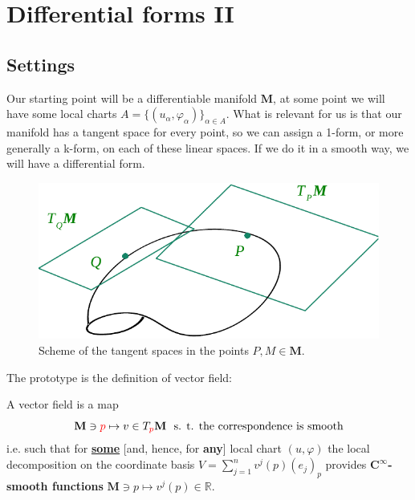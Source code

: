 \documentclass[../main.tex]{subfiles}
\begin{document}
\setchapterpreamble[u]{\margintoc}
\chapter[Differential forms II]{Differential forms II\footnotemark[0]}
\section*{Settings}
Our starting point will be a differentiable manifold $\mathbf{M}$, at some point we will have some local charts $A=\{(u_{\alpha},\varphi_{\alpha})\}_{\alpha\in A}$. What is relevant for us is that our manifold has a tangent space for every point, so we can assign a 1-form, or more generally a k-form, on each of these linear spaces. If we do it in a smooth way, we will have a differential form. 
\begin{figure}[H]
	\includegraphics{images/differential_forms_scheme_II.pdf}
	\caption{Scheme of the tangent spaces in the points $P,M\in\mathbf{M}$.}
\end{figure}
The prototype is the definition of vector field:
\begin{definition}
A vector field is a map
\[\mathbf{M}\ni {\color{red}p}\mapsto v\in T_{\color{red}p} \mathbf{M} \ \textrm{ s. t. the correspondence is smooth}\]
i.e. such that for \textbf{\underline{some}} [and, hence, for \textbf{any}] local chart $(u,\varphi)$ the local decomposition on the coordinate basis $V=\sum_{j=1}^n v^j(p)(e_j)_p$ provides $\mathbf{C^{\infty}}$\textbf{-smooth functions} $\mathbf{M}\ni p\mapsto v^j(p)\in\mathbb{R}$.
\end{definition}
\end{document}
